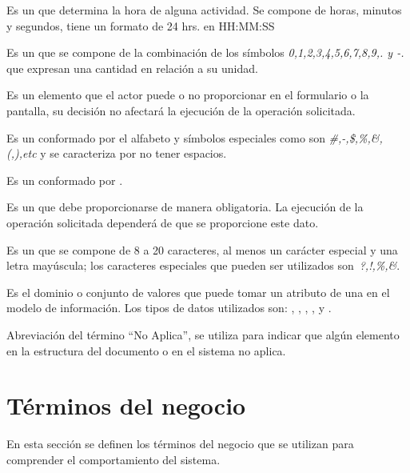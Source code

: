\begin{description}
 Es un  que determina la hora de alguna actividad. Se compone de horas, minutos y segundos, tiene un formato de 24 hrs. en  HH:MM:SS 

 Es un  que se compone de la combinación de los símbolos \textit{0,1,2,3,4,5,6,7,8,9,. y -.}  que expresan una cantidad en relación a su unidad.

 Es un elemento que el actor puede o no proporcionar en el formulario o la pantalla, su decisión no afectará la ejecución de la operación solicitada.

 Es un   conformado por el alfabeto y símbolos especiales como son \textit{\#,-,\$,\%,\&,(,),etc} y se caracteriza por no tener espacios.

 Es un  conformado por .

 Es un  que debe proporcionarse de manera obligatoria. La ejecución de la operación solicitada dependerá de que se proporcione este dato.

 Es un  que se compone de 8 a 20 caracteres, al menos un carácter especial y una letra mayúscula; los caracteres especiales que pueden ser utilizados son \textit{\,?,!,\%,\&}.


 Es el dominio o conjunto de valores que puede tomar un atributo de una  en el modelo de información. Los tipos de datos utilizados son: , , , ,  y .


 Abreviación del término ``No Aplica'', se utiliza para indicar que algún elemento en la estructura del documento o en el sistema no aplica.
\end{description}


\section{Términos del negocio}
\label{gls:terminosNegocio}
En esta sección se definen los términos del negocio que se utilizan para comprender el comportamiento del sistema.

